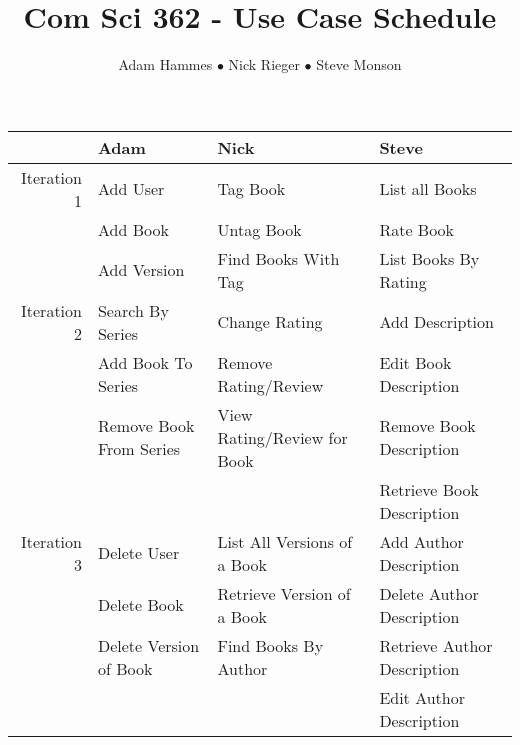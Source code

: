 \documentclass[10pt]{article}
\title{Com Sci 362 - Use Case Schedule}
\author{Adam Hammes $\bullet$ Nick Rieger $\bullet$ Steve Monson}
\begin{document}
\maketitle

\begin{center}
\begin{tabular}{| r | l | l | l |}
  \hline             & Adam                    & Nick                        & Steve                       \\ 

  \hline Iteration 1 & Add User                & Tag Book                    & List all Books              \\ 
                     & Add Book                & Untag Book                  & Rate Book                   \\ 
                     & Add Version             & Find Books With Tag         & List Books By Rating        \\

  \hline Iteration 2 & Search By Series        & Change Rating               & Add Description             \\
                     & Add Book To Series      & Remove Rating/Review        & Edit Book Description       \\
                     & Remove Book From Series & View Rating/Review for Book & Remove Book Description     \\
                     &                         &                             & Retrieve Book Description   \\

  \hline Iteration 3 & Delete User             & List All Versions of a Book & Add Author Description      \\
                     & Delete Book             & Retrieve Version of a Book  & Delete Author Description   \\
                     & Delete Version of Book  & Find Books By Author        & Retrieve Author Description \\
                     &                         &                             & Edit Author Description     \\
  \hline
\end{tabular}
\end{center}
\end{document}
